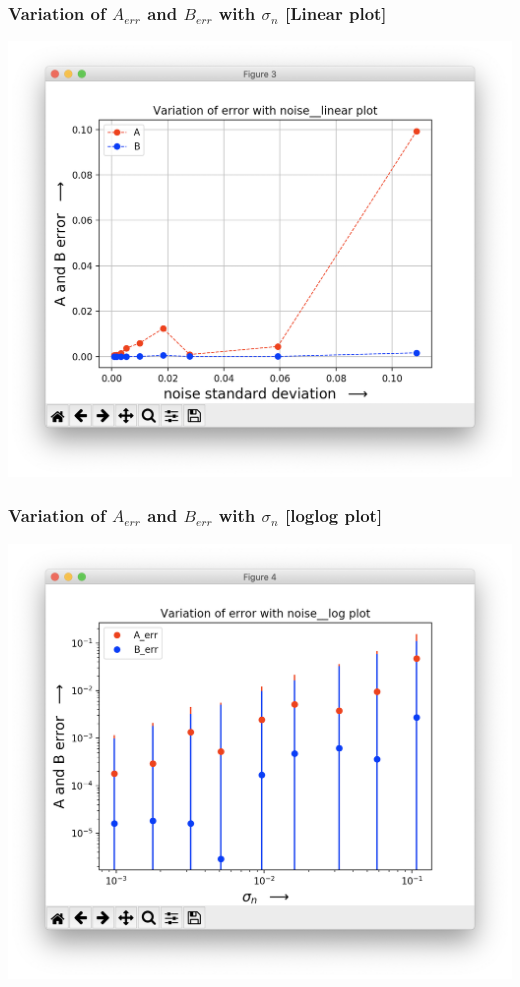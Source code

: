 \documentclass[10pt,english, openany]{book}
\begin{document}
\subsubsection{Variation of \textbf{$A_{err}$} and \textbf{$B_{err}$} with $\sigma_{n}$ [Linear plot]}
{\centering\includegraphics[scale=0.4]{scr2.png}}
\subsubsection{Variation of $A_{err}$ and $B_{err}$ with $\sigma_{n}$ [loglog plot]}
{\centering\includegraphics[scale=0.4]{scr1.png}}
\end{document}
